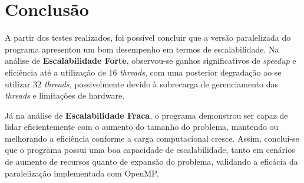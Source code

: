 \documentclass[a4paper, 12pt]{article}
\begin{document}
	 \section{Conclusão}
	 
	 \hspace{0.68cm}A partir dos testes realizados, foi possível concluir que a versão paralelizada do programa apresentou um bom desempenho em termos de escalabilidade. Na análise de \textbf{Escalabilidade Forte}, observou-se ganhos significativos de \textit{speedup} e eficiência até a utilização de 16 \textit{threads}, com uma posterior degradação ao se utilizar 32 \textit{threads}, possivelmente devido à sobrecarga de gerenciamento das \textit{threads} e limitações de hardware.
	 
	 \hspace{0.68cm}Já na análise de \textbf{Escalabilidade Fraca}, o programa demonstrou ser capaz de lidar eficientemente com o aumento do tamanho do problema, mantendo ou melhorando a eficiência conforme a carga computacional cresce. Assim, conclui-se que o programa possui uma boa capacidade de escalabilidade, tanto em cenários de aumento de recursos quanto de expansão do problema, validando a eficácia da paralelização implementada com OpenMP.
	 
	 
	 
	 
	 
\end{document}
